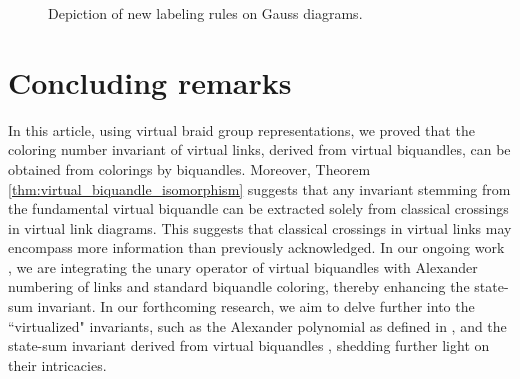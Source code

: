 \documentclass[11pt, reqno]{amsart}
\theoremstyle{definition}
\begin{document}
\begin{figure}[H]
\caption{Depiction of new labeling rules on Gauss diagrams.}
\label{fig:depiction_of_labeling_rules_on_Gauss_diagrms}
\end{figure}
 
\section{Concluding remarks}\label{sec:conclusion}
In this article, using virtual braid group representations, we proved that the coloring number invariant of virtual links, derived from virtual biquandles, can be obtained from colorings by biquandles. Moreover, Theorem \ref{thm:virtual_biquandle_isomorphism} suggests that any invariant stemming from the fundamental virtual biquandle can be extracted solely from classical crossings in virtual link diagrams. This suggests that classical crossings in virtual links may encompass more information than previously acknowledged. In our ongoing work \cite{2024arXiv240101533E}, we are integrating the unary operator of virtual biquandles with Alexander numbering of links and standard biquandle coloring, thereby enhancing the state-sum invariant. In our forthcoming research, we aim to delve further into the ``virtualized" invariants, such as the Alexander polynomial as defined in \cite{MR4284604, MR1280610, MR1822148}, and the state-sum invariant derived from virtual biquandles \cite{MR3982044, MR2515811}, shedding further light on their intricacies.
\end{document}
